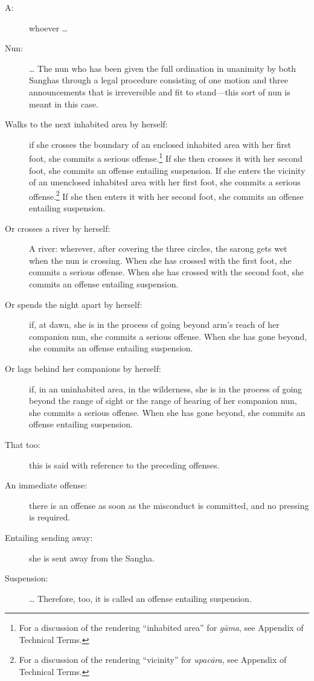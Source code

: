 \documentclass[12pt,openany]{book}%
\begin{document}
\begin{description}%
\item[A: ] whoever … %
\item[Nun: ] … The nun who has been given the full ordination in unanimity by both Sanghas through a legal procedure consisting of one motion and three announcements that is irreversible and fit to stand—this sort of nun is meant in this case. %
\item[Walks to the next inhabited area by herself: ] if she crosses the boundary of an enclosed inhabited area with her first foot, she commits a serious offense.\footnote{For a discussion of the rendering “inhabited area” for \textit{\textsanskrit{gāma}}, see Appendix of Technical Terms. }  If she then crosses it with her second foot, she commits an offense entailing suspension. If she enters the vicinity of an unenclosed inhabited area with her first foot, she commits a serious offense.\footnote{For a discussion of the rendering “vicinity” for \textit{\textsanskrit{upacāra}}, see Appendix of Technical Terms. } If she then enters it with her second foot, she commits an offense entailing suspension. %
\item[Or crosses a river by herself: ] A river: wherever, after covering the three circles, the sarong gets wet when the nun is crossing. When she has crossed with the first foot, she commits a serious offense. When she has crossed with the second foot, she commits an offense entailing suspension. %
\item[Or spends the night apart by herself: ] if, at dawn, she is in the process of going beyond arm’s reach of her companion nun, she commits a serious offense. When she has gone beyond, she commits an offense entailing suspension. %
\item[Or lags behind her companions by herself: ] if, in an uninhabited area, in the wilderness, she is in the process of going beyond the range of sight or the range of hearing of her companion nun, she commits a serious offense. When she has gone beyond, she commits an offense entailing suspension. %
\item[That too: ] this is said with reference to the preceding offenses. %
\item[An immediate offense: ] there is an offense as soon as the misconduct is committed, and no pressing is required. %
\item[Entailing sending away: ] she is sent away from the Sangha. %
\item[Suspension: ] … Therefore, too, it is called an offense entailing suspension. %
\end{description}
\end{document}
